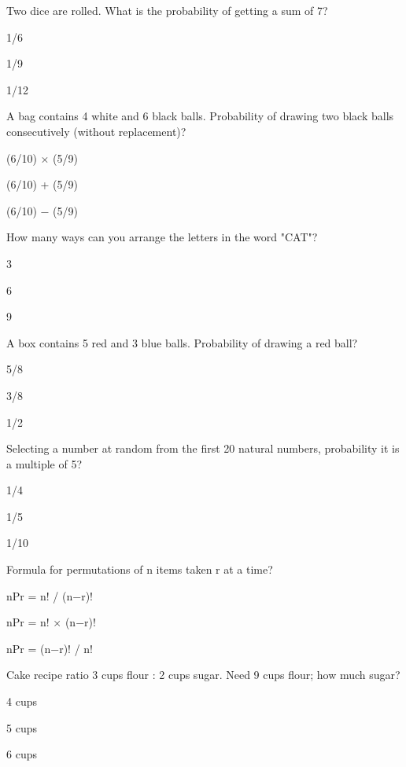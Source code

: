 \begin{enhancedmcq}{Two dice are rolled. What is the probability of getting a sum of 7?}
\item 1/6
\item 1/9
\item 1/12

\end{enhancedmcq}
\begin{enhancedmcq}{A bag contains 4 white and 6 black balls. Probability of drawing two black balls consecutively (without replacement)?}
\item (6/10) × (5/9)
\item (6/10) + (5/9)
\item (6/10) − (5/9)

\end{enhancedmcq}
\begin{enhancedmcq}{How many ways can you arrange the letters in the word "CAT"?}
\item 3
\item 6
\item 9

\end{enhancedmcq}
\begin{enhancedmcq}{A box contains 5 red and 3 blue balls. Probability of drawing a red ball?}
\item 5/8
\item 3/8
\item 1/2

\end{enhancedmcq}
\begin{enhancedmcq}{Selecting a number at random from the first 20 natural numbers, probability it is a multiple of 5?}
\item 1/4
\item 1/5
\item 1/10

\end{enhancedmcq}
\begin{enhancedmcq}{Formula for permutations of n items taken r at a time?}
\item nPr = n! / (n−r)!
\item nPr = n! × (n−r)!
\item nPr = (n−r)! / n!

\end{enhancedmcq}
\begin{enhancedmcq}{Cake recipe ratio 3 cups flour : 2 cups sugar. Need 9 cups flour; how much sugar?}
\item 4 cups
\item 5 cups
\item 6 cups

\end{enhancedmcq}
